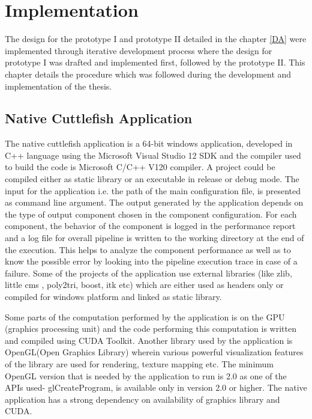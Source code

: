 \chapter{Implementation} \label{impl}

The design for the prototype I and prototype II detailed in the chapter \ref{DA} were implemented through iterative development process where the design for prototype I was drafted and implemented first, followed by the prototype II. This chapter details the procedure which was followed during the development and implementation of the thesis.  

\section{Native Cuttlefish Application} 
The native cuttlefish application is a 64-bit windows application, developed in C++ language using the Microsoft Visual Studio 12 SDK and the compiler used to build the code is Microsoft C/C++ V120 compiler. A project could be compiled either as static library or an executable in release or debug mode. The input for the application i.e. the path of the main configuration file, is presented as command line argument. The output generated by the application depends on the type of output component chosen in the component configuration. For each component, the behavior of the component is logged in the performance report and a log file for overall pipeline is written to the working directory at the end of the execution. This helps to analyze the component performance as well as to know the possible error by looking into the pipeline execution trace in case of a failure. Some of the projects of the application use external libraries (like zlib, little cms , poly2tri, boost, itk etc) which are either used as headers only or compiled for windows platform and linked as static library. 

Some parts of the computation performed by the application is on the GPU (graphics processing unit) and the code performing this computation is written and compiled using CUDA Toolkit. Another library used by the application is OpenGL(Open Graphics Library) wherein various powerful visualization features of the library are used for rendering, texture mapping etc. The minimum OpenGL version that is needed by the application to run is 2.0 as one of the APIs used- glCreateProgram, is available only in version 2.0 or higher. The native application has a strong dependency on availability of graphics library and CUDA.     

